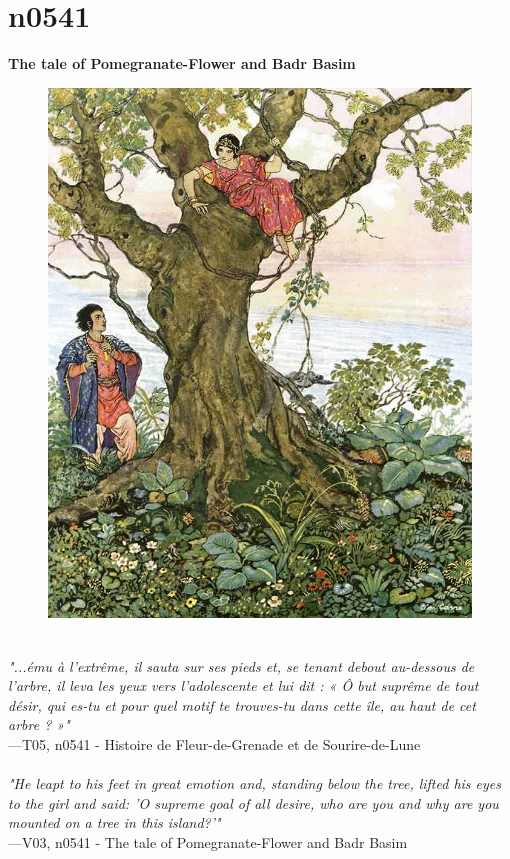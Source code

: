 \documentclass[../Carre_nights.tex]{subfiles}
\begin{document}
\newpage

\section{n0541}
\textbf{\Large{The tale of Pomegranate-Flower and Badr Basim}} \\

\begin{figure}[ht]
\centering
\includegraphics[height=\figsize]{illustrations/volume_5/T05, n0541 - Histoire de Fleur-de-Grenade et de Sourire-de-Lune.jpg}
\end{figure}

\textit{\\
"...ému à l’extrême, il sauta sur ses pieds et, se tenant debout au-dessous de l’arbre, il leva les yeux vers l’adolescente et lui dit : « Ô but suprême de tout désir, qui es-tu et pour quel motif te trouves-tu dans cette île, au haut de cet arbre ? »"} \\
—T05, n0541 - Histoire de Fleur-de-Grenade et de Sourire-de-Lune \\~\\
\textit{"He leapt to his feet in great emotion and, standing below the tree, lifted his eyes to the girl and said: 'O supreme goal of all desire, who are you and why are you mounted on a tree in this island?'"} \\
—V03, n0541 - The tale of Pomegranate-Flower and Badr Basim
\end{document}
